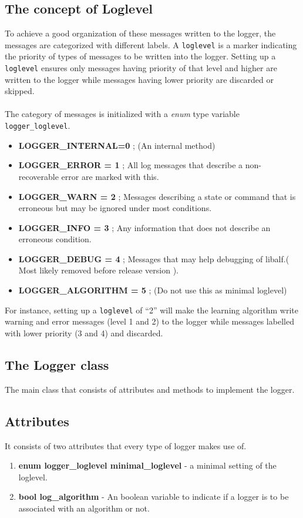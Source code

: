 \subsection{The concept of Loglevel}

To achieve a good organization of these messages written to the logger, the messages are categorized with different labels. A  \texttt{loglevel} is a marker indicating the priority of types of messages to be written into the logger. Setting up a \texttt{loglevel} ensures only messages having priority of that level and higher are written to the logger while messages having lower priority are discarded or skipped.
\paragraph{}
The category of messages is initialized with a \emph{enum} type variable \texttt{logger\_loglevel}.
\begin{itemize}
 \item \textbf{LOGGER\_INTERNAL=0} ; (An internal method)
 \item \textbf{LOGGER\_ERROR = 1} ; All log messages that describe a non-recoverable error are marked with this.
 \item \textbf{LOGGER\_WARN = 2} ; Messages describing a state or command that is erroneous but may be ignored under most conditions.
 \item \textbf{LOGGER\_INFO = 3} ; Any information that does not describe an erroneous condition.
 \item \textbf{LOGGER\_DEBUG = 4} ; Messages that may help debugging of libalf.( Most likely removed before release version ).
 \item \textbf{LOGGER\_ALGORITHM = 5} ; (Do not use this as minimal loglevel)
\end{itemize}
For instance, setting up a \texttt{loglevel} of ``2'' will make the learning algorithm write warning and error messages (level 1 and 2) to the logger while messages labelled with lower priority (3 and 4) and discarded.

\subsection{The Logger class}
The main class that consists of attributes and methods to implement the logger. 

\subsection*{Attributes} 
It consists of two attributes that every type of logger makes use of.
\begin{enumerate}
 \item \textbf{enum logger\_loglevel minimal\_loglevel} - a minimal setting of the loglevel.
 \item \textbf{bool log\_algorithm} - An boolean variable to indicate if a logger is to be associated with an algorithm or not.
\end{enumerate}

